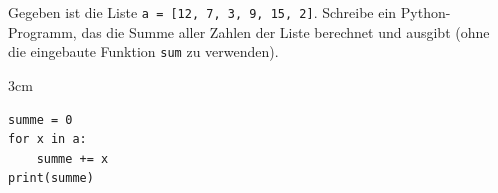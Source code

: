 \question[3]
Gegeben ist die Liste \texttt{a = [12, 7, 3, 9, 15, 2]}. Schreibe ein Python-Programm,
 das die Summe aller Zahlen der Liste berechnet und ausgibt
  (ohne die eingebaute Funktion \texttt{sum} zu verwenden).

\begin{solutionbox}{3cm}
\begin{lstlisting}
summe = 0
for x in a:
    summe += x
print(summe)
\end{lstlisting}
\end{solutionbox}